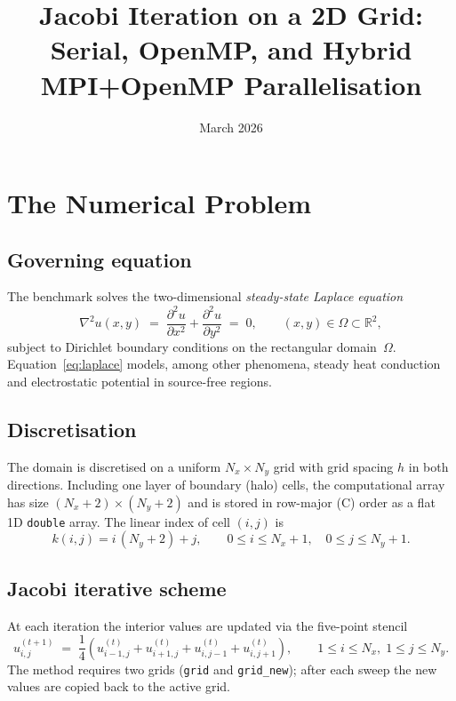 \documentclass[11pt,a4paper]{article}
\title{\textbf{Jacobi Iteration on a 2D Grid:\\
  Serial, OpenMP, and Hybrid MPI+OpenMP Parallelisation}}
\author{}
\date{March 2026}
\begin{document}
\maketitle
\tableofcontents
\newpage

\section{The Numerical Problem}

\subsection{Governing equation}

The benchmark solves the two-dimensional \emph{steady-state Laplace equation}
\begin{equation}
  \nabla^2 u(x,y)
  \;=\;
  \frac{\partial^2 u}{\partial x^2} + \frac{\partial^2 u}{\partial y^2}
  \;=\; 0,
  \qquad (x,y)\in\Omega \subset \mathbb{R}^2,
  \label{eq:laplace}
\end{equation}
subject to Dirichlet boundary conditions on the rectangular domain~$\Omega$.
Equation~\eqref{eq:laplace} models, among other phenomena, steady heat conduction
and electrostatic potential in source-free regions.

\subsection{Discretisation}

The domain is discretised on a uniform $N_x \times N_y$ grid with grid spacing
$h$ in both directions.  Including one layer of boundary (halo) cells, the
computational array has size $(N_x+2)\times(N_y+2)$ and is stored in row-major
(C) order as a flat 1D \texttt{double} array.  The linear index of cell $(i,j)$
is
\begin{equation}
  k(i,j) = i\,(N_y+2) + j,
  \qquad 0 \le i \le N_x+1,\quad 0 \le j \le N_y+1.
\end{equation}

\subsection{Jacobi iterative scheme}

At each iteration the interior values are updated via the five-point stencil
\begin{equation}
  u^{(t+1)}_{i,j}
  \;=\;
  \frac{1}{4}\!\left(
    u^{(t)}_{i-1,j} + u^{(t)}_{i+1,j}
    + u^{(t)}_{i,j-1} + u^{(t)}_{i,j+1}
  \right),
  \qquad 1 \le i \le N_x,\; 1 \le j \le N_y.
  \label{eq:jacobi}
\end{equation}
The method requires two grids (\texttt{grid} and \texttt{grid\_new}); after
each sweep the new values are copied back to the active grid.
\end{document}
